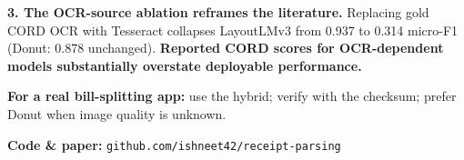 \documentclass[landscape,a0paper,fontscale=0.285]{baposter}
\begin{document}
\begin{poster}
{\smallskip

\textbf{3. The OCR-source ablation reframes the literature.} Replacing gold CORD OCR
with Tesseract collapses LayoutLMv3 from 0.937 to 0.314 micro-F1 (Donut: 0.878
unchanged). \textbf{Reported CORD scores for OCR-dependent models substantially overstate
deployable performance.}

\smallskip

\textbf{For a real bill-splitting app:} use the hybrid; verify with the checksum;
prefer Donut when image quality is unknown.

\medskip

\centering
\small \textbf{Code \& paper:} \texttt{github.com/ishneet42/receipt-parsing}
}


\end{poster}
\end{document}
